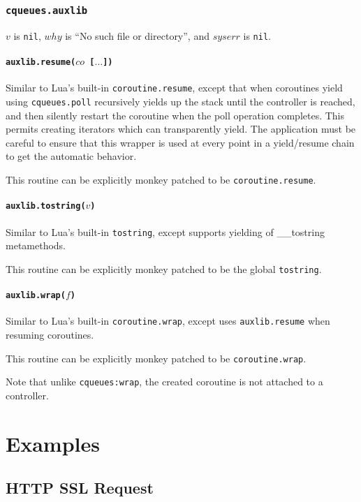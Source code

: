 \documentclass[11pt, oneside]{memoir}
\newcommand*{\fn}[1]{\texttt{#1}\xspace}
\newcommand*{\nil}[0]{\texttt{nil}\xspace}
\newcounter{toccols}
\newenvironment{Module}[1]{
	\subsection{\texttt{#1}}
	\addtocontents{toc}{
		\protect\begin{multicols}{\value{toccols}}
	}
}{
	\addtocontents{toc}{\protect\end{multicols}}
}
\begin{document}
\begin{Module}{cqueues.auxlib}
$v$ is \nil, $why$ is ``No such file or directory'', and $syserr$ is \nil.

\subsubsection[\fn{auxlib.resume}]{\fn{auxlib.resume($co$ [$\ldots$])}}

Similar to Lua's built-in \fn{coroutine.resume}, except that when coroutines yield using \fn{cqueues.poll} recursively yields up the stack until the controller is reached, and then silently restart the coroutine when the poll operation completes. This permits creating iterators which can transparently yield. The application must be careful to ensure that this wrapper is used at every point in a yield/resume chain to get the automatic behavior.

This routine can be explicitly monkey patched to be \fn{coroutine.resume}.

\subsubsection[\fn{auxlib.tostring}]{\fn{auxlib.tostring($v$)}}

Similar to Lua's built-in \fn{tostring}, except supports yielding of \_\_tostring metamethods.

This routine can be explicitly monkey patched to be the global \fn{tostring}.

\subsubsection[\fn{auxlib.wrap}]{\fn{auxlib.wrap($f$)}}

Similar to Lua's built-in \fn{coroutine.wrap}, except uses \fn{auxlib.resume} when resuming coroutines.

This routine can be explicitly monkey patched to be \fn{coroutine.wrap}.

Note that unlike \fn{cqueues:wrap}, the created coroutine is not attached to a controller.

\end{Module}


\chapter{Examples}

\section{HTTP SSL Request}
\end{document}
